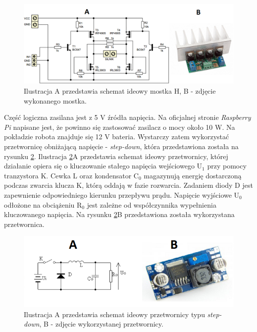 \newpage
\begin{figure}[H]
    \begin{center}
      \includegraphics[scale=0.45]{imgs/mostek_h_schemat.png}
 	\caption[Schemat mostka H.]{\small{Ilustracja A przedstawia schemat ideowy mostka H, B - zdjęcie wykonanego mostka.}\footnotemark}
	\label{mostek_h_sch}
    \end{center}
  \end{figure}  
  	  
Część logiczna zasilana jest z 5 V źródła napięcia. Na oficjalnej stronie \textit{Raspberry Pi} napisane jest, że powinno się zastosować zasilacz o mocy około 10 W. Na pokładzie robota znajduje się 12 V bateria. Wystarczy zatem wykorzystać przetwornicę obniżającą napięcie - \textit{step-down}, która przedstawiona została na rysunku \ref{p_dc_dc_sch}. Ilustracja \ref{p_dc_dc_sch}A przedstawia schemat ideowy przetwornicy, której działanie opiera się o kluczowanie stałego napięcia wejściowego U$_1$ przy pomocy tranzystora K. Cewka L oraz kondensator C$_0$ magazynują energię dostarczoną podczas zwarcia klucza K, którą oddają w fazie rozwarcia. Zadaniem diody D jest zapewnienie odpowiedniego kierunku przepływu prądu. Napięcie wyjściowe U$_0$ odłożone na obciążeniu R$_0$ jest zależne od współczynnika wypełnienia kluczowanego napięcia. Na rysunku \ref{p_dc_dc_sch}B przedstawiona została wykorzystana przetwornica. 
\begin{figure}[H]
    \begin{center}
      \includegraphics[scale=0.82]{imgs/przetwornica.png}
 	\caption[Przetwornica obniżająca napięcie DC/DC]{\small{Ilustracja A przedstawia schemat ideowy przetwornicy typu \textit{step-down}}\footnotemark \small{, B - zdjęcie wykorzystanej przetwornicy.}\footnotemark}
	\label{p_dc_dc_sch}
    \end{center}
  \end{figure}  

